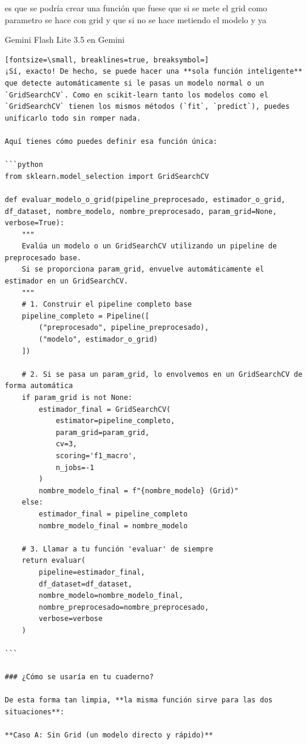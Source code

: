 \documentclass[12pt,a4paper,oneside]{book}
\begin{document}
\begin{iaprompt}
es que se podría crear una función que fuese que si se mete el grid como parametro se hace con grid y que si no se hace metiendo el modelo y ya
\end{iaprompt}
\begin{iaresp}{Gemini Flash Lite 3.5 en Gemini}
\begin{Verbatim}[fontsize=\small, breaklines=true, breaksymbol=]
¡Sí, exacto! De hecho, se puede hacer una **sola función inteligente** que detecte automáticamente si le pasas un modelo normal o un `GridSearchCV`. Como en scikit-learn tanto los modelos como el `GridSearchCV` tienen los mismos métodos (`fit`, `predict`), puedes unificarlo todo sin romper nada.

Aquí tienes cómo puedes definir esa función única:

```python
from sklearn.model_selection import GridSearchCV

def evaluar_modelo_o_grid(pipeline_preprocesado, estimador_o_grid, df_dataset, nombre_modelo, nombre_preprocesado, param_grid=None, verbose=True):
    """
    Evalúa un modelo o un GridSearchCV utilizando un pipeline de preprocesado base.
    Si se proporciona param_grid, envuelve automáticamente el estimador en un GridSearchCV.
    """
    # 1. Construir el pipeline completo base
    pipeline_completo = Pipeline([
        ("preprocesado", pipeline_preprocesado),
        ("modelo", estimador_o_grid)
    ])
    
    # 2. Si se pasa un param_grid, lo envolvemos en un GridSearchCV de forma automática
    if param_grid is not None:
        estimador_final = GridSearchCV(
            estimator=pipeline_completo,
            param_grid=param_grid,
            cv=3,
            scoring='f1_macro',
            n_jobs=-1
        )
        nombre_modelo_final = f"{nombre_modelo} (Grid)"
    else:
        estimador_final = pipeline_completo
        nombre_modelo_final = nombre_modelo

    # 3. Llamar a tu función 'evaluar' de siempre
    return evaluar(
        pipeline=estimador_final, 
        df_dataset=df_dataset, 
        nombre_modelo=nombre_modelo_final, 
        nombre_preprocesado=nombre_preprocesado, 
        verbose=verbose
    )

```

### ¿Cómo se usaría en tu cuaderno?

De esta forma tan limpia, **la misma función sirve para las dos situaciones**:

**Caso A: Sin Grid (un modelo directo y rápido)**


\end{Verbatim}
\end{iaresp}
\end{document}
